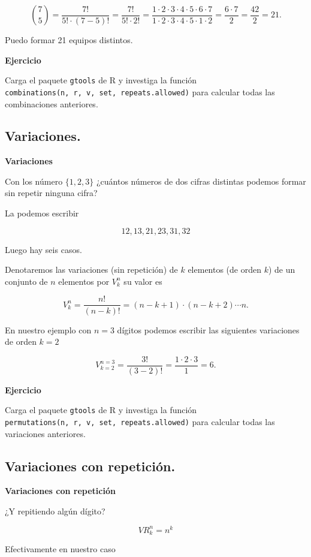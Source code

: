 \documentclass[]{book}
\begin{document}
\[
{7\choose 5} = \frac{7!}{5!\cdot (7-5)!}=\frac{7!}{5!\cdot 2!}=
\frac{1\cdot 2\cdot 3 \cdot 4\cdot 5\cdot 6\cdot 7}{1\cdot 2\cdot 3 \cdot 4\cdot 5\cdot 1\cdot 2}=\frac{6\cdot 7}{2}=\frac{42}{2}=21.
\]

Puedo formar 21 equipos distintos.

\textbf{Ejercicio}

Carga el paquete \texttt{gtools} de R y investiga la función \texttt{combinations(n,\ r,\ v,\ set,\ repeats.allowed)} para calcular todas las combinaciones anteriores.

\hypertarget{variaciones.}{%
\subsection{Variaciones.}\label{variaciones.}}

\textbf{Variaciones}

Con los número \(\{1,2,3\}\) ¿cuántos números de dos cifras distintas podemos formar sin repetir ninguna cifra?

La podemos escribir

\[12,13,21,23,31,32\]

Luego hay seis casos.

Denotaremos las variaciones (sin repetición) de \(k\) elementos (de orden \(k\)) de un conjunto de \(n\) elementos por \(V^n_k\) su valor es

\[
V^n_k=\frac{n!}{(n-k)!}=(n-k+1)\cdot (n-k+2)\cdots n.
\]

En nuestro ejemplo con \(n=3\) dígitos podemos escribir las siguientes variaciones de orden \(k=2\)

\[
V_{k=2}^{n=3}=\frac{3!}{(3-2)!}=\frac{1\cdot 2\cdot 3}{1}=6.
\]

\textbf{Ejercicio}

Carga el paquete \texttt{gtools} de R y investiga la función \texttt{permutations(n,\ r,\ v,\ set,\ repeats.allowed)} para calcular todas las variaciones anteriores.

\hypertarget{variaciones-con-repeticiuxf3n.}{%
\subsection{Variaciones con repetición.}\label{variaciones-con-repeticiuxf3n.}}

\textbf{Variaciones con repetición}

¿Y repitiendo algún dígito?

\[VR^n_k=n^k\]

Efectivamente en nuestro caso
\end{document}
